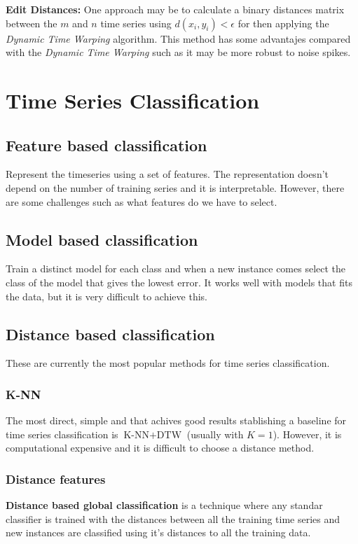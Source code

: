 \textbf{Edit Distances:} One approach may be to calculate a binary distances matrix between the $m$ and $n$ time series using $d(x_i, y_i) < \epsilon$ for then applying the \textit{Dynamic Time Warping} algorithm. This method has some advantajes compared with the \textit{Dynamic Time Warping} such as it may be more robust to noise spikes.


\section{Time Series Classification}

\subsection{Feature based classification}
Represent the timeseries using a set of features. The representation doesn't depend on the number of training series and it is interpretable. However, there are some challenges such as what features do we have to select.

\subsection{Model based classification}
Train a distinct model for each class and when a new instance comes select the class of the model that gives the lowest error. It works well with models that fits the data, but it is very difficult to achieve this.

\subsection{Distance based classification}
These are currently the most popular methods for time series classification. 

\subsubsection{K-NN}
The most direct, simple and that achives good results stablishing a baseline for time series classification is $\text{K-NN} + \text{DTW}$ (usually with $K=1$). However, it is computational expensive and it is difficult to choose a distance method.

\subsubsection{Distance features}
\textbf{Distance based global classification} is a technique where any standar classifier is trained with the distances between all the training time series and new instances are classified using it's distances to all the training data.

